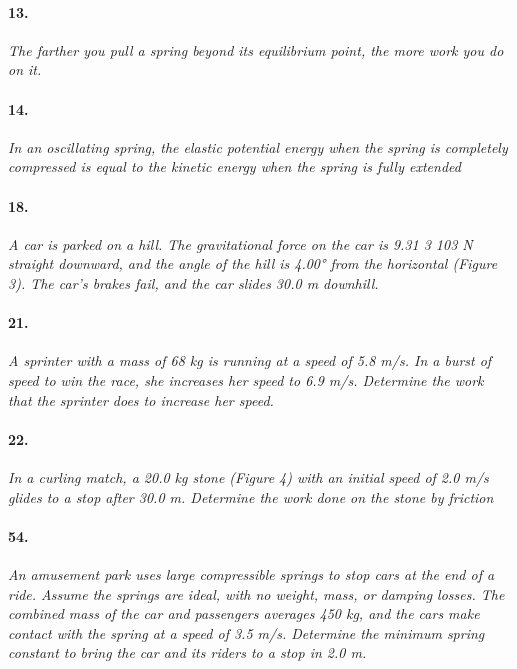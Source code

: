 \documentclass[]{article}
\begin{document}
\paragraph{13.}
\textit{
	The farther you pull a spring beyond its equilibrium
	point, the more work you do on it.
}\\	
\par
\paragraph{14.}
\textit{
	In an oscillating spring, the elastic potential energy
	when the spring is completely compressed is equal to
	the kinetic energy when the spring is fully extended
}\\	
\par
\paragraph{18.}
\textit{
	 A car is parked on a hill. The gravitational force on the
	car is 9.31 3 103 N straight downward, and the angle of
	the hill is 4.00° from the horizontal (Figure 3). The car’s
	brakes fail, and the car slides 30.0 m downhill. 
}\\	
\par
\paragraph{21.}
\textit{
	A sprinter with a mass of 68 kg is running at a
	speed of 5.8 m/s. In a burst of speed to win the race,
	she increases her speed to 6.9 m/s. Determine the
	work that the sprinter does to increase her speed.
}\\	
\par
\paragraph{22.}
\textit{
	In a curling match, a 20.0 kg stone (Figure 4) with an
	initial speed of 2.0 m/s glides to a stop after 30.0 m.
	Determine the work done on the stone by friction
}\\	
\par
\paragraph{54.}
\textit{
	An amusement park uses large compressible springs
	to stop cars at the end of a ride. Assume the springs
	are ideal, with no weight, mass, or damping losses.
	The combined mass of the car and passengers
	averages 450 kg, and the cars make contact with the
	spring at a speed of 3.5 m/s. Determine the minimum
	spring constant to bring the car and its riders to a
	stop in 2.0 m.
}\\	
\par
\end{document}
